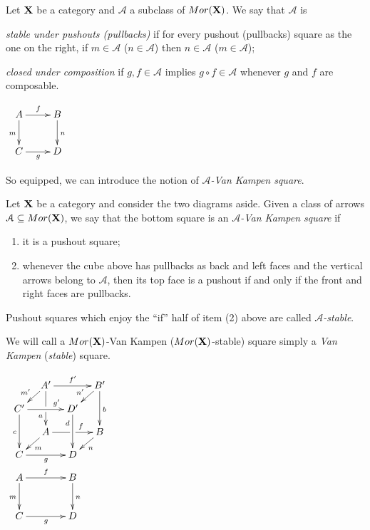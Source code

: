 \documentclass[a4paper,UKenglish,cleveref,pdftex,thm-restate,numberwithinsect,anonymous]{lipics}
\newcommand{\mor}{\mathsf{Mor}}
\def\A{\textbf {\textup{A}}}
\def\C{\textbf {\textup{C}}}
\def\X{\textbf {\textup{X}}}
\begin{document}
\begin{definition}
  Let $\X$ be a category and $\mathcal{A}$ a subclass of
  $\mor(\X)$. We say that $\mathcal{A}$ is
  \begin{itemize}
    \parbox{11cm}{\item
      \emph{stable under pushouts (pullbacks)} if for every pushout (pullbacks) square as the one on the right, 	if $m \in \mathcal{A}$ ($n\in \mathcal{A}$) then $n \in \mathcal{A}$ ($m \in \mathcal{A}$);
    \item \emph{closed under composition} if $g, f\in \mathcal{A}$ implies $g\circ f\in \mathcal{A}$ whenever $g$ and $f$ are composable.{\tiny }}\hfill
    \parbox{2cm}{$\xymatrix{A\ar[r]^f  \ar[d]_{m}& B \ar[d]^n \\ C \ar[r]_g & D}$}
    \parbox{11cm}{}\hfill
  \end{itemize}
\end{definition}

So equipped, we can introduce the notion of \emph{$\mathcal{A}$-Van Kampen square}.

\noindent
\parbox{10cm}{
  \begin{definition}
    Let $\X$ be a category and consider the two diagrams aside.
    Given  a class of arrows $\mathcal{A}\subseteq \mor(\X)$, we say that the bottom square
    is an \emph{$\mathcal{A}$-Van Kampen square} if
    \begin{enumerate}
    \item it is a pushout square;
    \item 	whenever the cube above has pullbacks as back and left faces and the vertical arrows belong to $\mathcal{A}$, then its top face is a pushout 
    if and only if the front and right faces are pullbacks.
    \end{enumerate}
    Pushout squares which enjoy the ``if'' half of item (2) above are called \emph{$\mathcal{A}$-stable}.
    
    We will call a $\mor(\X)$-Van Kampen ($\mor(\X)$-stable) square simply a \emph{Van Kampen} (\emph{stable}) square.
  \end{definition}}
\parbox{2cm}{$\xymatrix@C=10pt@R=10pt{&A'\ar[dd]|\hole_(.65){a}\ar[rr]^{f'} \ar[dl]_{m'} && B' \ar[dd]^{b} \ar[dl]_{n'} \\ C'  \ar[dd]_{c}\ar[rr]^(.7){g'} & & D' \ar[dd]_(.3){d}\\&A\ar[rr]|\hole^(.65){f} \ar[dl]^{m} && B \ar[dl]^{n} \\C \ar[rr]_{g} & & D \\A \ar[dd]_{m}\ar[rr]^{f}&&B\ar[dd]^{n}\\ \\C\ar[rr]_{g} &&D}$ }
\end{document}
